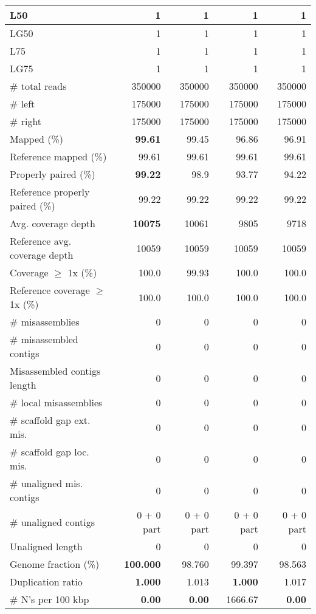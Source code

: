 \documentclass[12pt,a4paper]{article}
\begin{document}
\begin{table}[ht]
\begin{center}
\begin{tabular}{|l*{4}{|r}|}
L50 & 1 & 1 & 1 & 1 \\ \hline
LG50 & 1 & 1 & 1 & 1 \\ \hline
L75 & 1 & 1 & 1 & 1 \\ \hline
LG75 & 1 & 1 & 1 & 1 \\ \hline
\# total reads & 350000 & 350000 & 350000 & 350000 \\ \hline
\# left & 175000 & 175000 & 175000 & 175000 \\ \hline
\# right & 175000 & 175000 & 175000 & 175000 \\ \hline
Mapped (\%) & {\bf 99.61} & 99.45 & 96.86 & 96.91 \\ \hline
Reference mapped (\%) & 99.61 & 99.61 & 99.61 & 99.61 \\ \hline
Properly paired (\%) & {\bf 99.22} & 98.9 & 93.77 & 94.22 \\ \hline
Reference properly paired (\%) & 99.22 & 99.22 & 99.22 & 99.22 \\ \hline
Avg. coverage depth & {\bf 10075} & 10061 & 9805 & 9718 \\ \hline
Reference avg. coverage depth & 10059 & 10059 & 10059 & 10059 \\ \hline
Coverage $\geq$ 1x (\%) & 100.0 & 99.93 & 100.0 & 100.0 \\ \hline
Reference coverage $\geq$ 1x (\%) & 100.0 & 100.0 & 100.0 & 100.0 \\ \hline
\# misassemblies & 0 & 0 & 0 & 0 \\ \hline
\# misassembled contigs & 0 & 0 & 0 & 0 \\ \hline
Misassembled contigs length & 0 & 0 & 0 & 0 \\ \hline
\# local misassemblies & 0 & 0 & 0 & 0 \\ \hline
\# scaffold gap ext. mis. & 0 & 0 & 0 & 0 \\ \hline
\# scaffold gap loc. mis. & 0 & 0 & 0 & 0 \\ \hline
\# unaligned mis. contigs & 0 & 0 & 0 & 0 \\ \hline
\# unaligned contigs & 0 + 0 part & 0 + 0 part & 0 + 0 part & 0 + 0 part \\ \hline
Unaligned length & 0 & 0 & 0 & 0 \\ \hline
Genome fraction (\%) & {\bf 100.000} & 98.760 & 99.397 & 98.563 \\ \hline
Duplication ratio & {\bf 1.000} & 1.013 & {\bf 1.000} & 1.017 \\ \hline
\# N's per 100 kbp & {\bf 0.00} & {\bf 0.00} & 1666.67 & {\bf 0.00} \\ \hline

\end{tabular}
\end{center}
\end{table}
\end{document}
